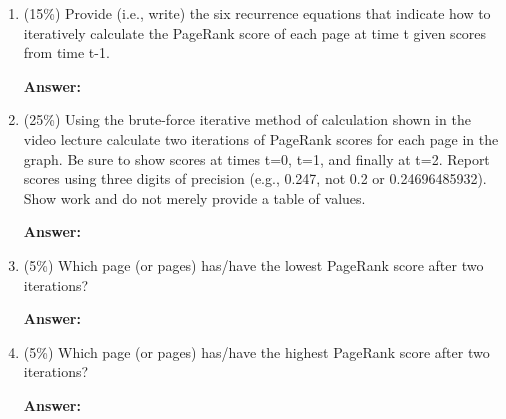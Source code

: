 \documentclass[11pt]{article}
\begin{document}
\begin{enumerate}
        \begin{enumerate}
            \item (15\%) Provide (i.e., write) the six recurrence equations that indicate how to iteratively calculate the PageRank score of each page at time t given scores from time t-1.
            
            \textbf{Answer:}

            \item (25\%) Using the brute-force iterative method of calculation shown in the video lecture calculate two iterations of PageRank scores for each page in the graph. Be sure to show scores at times t=0, t=1, and finally at t=2. Report scores using three digits of precision (e.g., 0.247, not 0.2 or 0.24696485932). Show work and do not merely provide a table of values.
            
            \textbf{Answer:}

            \item (5\%) Which page (or pages) has/have the lowest PageRank score after two iterations?
            
            \textbf{Answer:}

            \item (5\%) Which page (or pages) has/have the highest PageRank score after two iterations?
            
            \textbf{Answer:}

        \end{enumerate}

    \end{enumerate}
\end{document}
